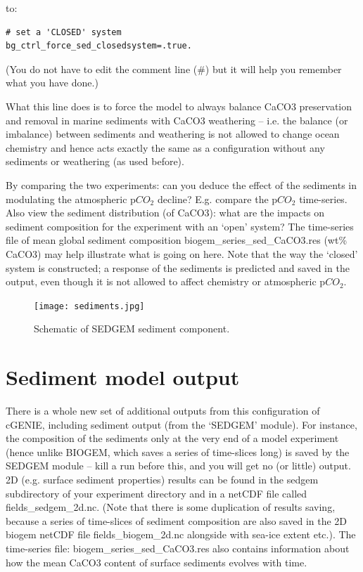 \documentclass[11pt,fleqn]{book} %
\begin{document}
to: 

\begin{verbatim}
# set a 'CLOSED' system
bg_ctrl_force_sed_closedsystem=.true.
\end{verbatim}

(You do not have to edit the comment line (\#) but it will help you remember what you have done.)

What this line does is to force the model to always balance CaCO3 preservation and removal in marine sediments with CaCO3 weathering – i.e. the balance (or imbalance) between sediments and weathering is not allowed to change ocean chemistry and hence acts exactly the same as a configuration without any sediments or weathering (as used before).

By comparing the two experiments: can you deduce the effect of the sediments in modulating the atmospheric p\(CO_{2}\) decline? E.g. compare the p\(CO_{2}\) time-series. Also view the sediment distribution (of CaCO3): what are the impacts on sediment composition for the experiment with an ‘open’ system? The time-series file of mean global sediment composition biogem\_series\_sed\_CaCO3.res (wt\% CaCO3) may help illustrate what is going on here.
Note that the way the ‘closed’ system is constructed; a response of the sediments is predicted and saved in the output, even though it is not allowed to affect chemistry or atmospheric p\(CO_{2}\).

\begin{figure}
\texttt{[image: sediments.jpg]}
\caption{Schematic of SEDGEM sediment component.}
\label{fig:sediments}
\end{figure}


\section{Sediment model output}

There is a whole new set of additional outputs from this configuration of cGENIE, including sediment output (from the ‘SEDGEM’ module). For instance, the composition of the sediments only at the very end of a model experiment (hence unlike BIOGEM, which saves a series of time-slices long) is saved by the SEDGEM module – kill a run before this, and you will get no (or little) output. 2D (e.g. surface sediment properties) results can be found in the sedgem subdirectory of your experiment directory and in a netCDF file called fields\_sedgem\_2d.nc. (Note that there is some duplication of results saving, because a series of time-slices of sediment composition are also saved in the 2D biogem netCDF file fields\_biogem\_2d.nc alongside with sea-ice extent etc.). The time-series file: biogem\_series\_sed\_CaCO3.res also contains information about how the mean CaCO3 content of surface sediments evolves with time.
\end{document}
